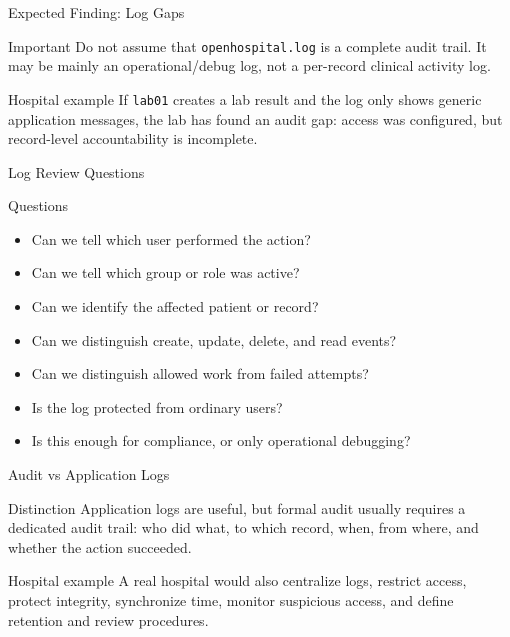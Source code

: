 \documentclass[presentation]{beamer}
\begin{document}
\begin{frame}[c]{Expected Finding: Log Gaps}
\begin{block}{Important}
Do not assume that \texttt{openhospital.log} is a complete audit trail. It may be mainly an
operational/debug log, not a per-record clinical activity log.
\end{block}

\begin{exampleblock}{Hospital example}
If \texttt{lab01} creates a lab result and the log only shows generic application messages, the lab
has found an audit gap: access was configured, but record-level accountability is incomplete.
\end{exampleblock}
\end{frame}

\begin{frame}[c]{Log Review Questions}
\begin{block}{Questions}
\begin{itemize}
    \item Can we tell which user performed the action?
    \item Can we tell which group or role was active?
    \item Can we identify the affected patient or record?
    \item Can we distinguish create, update, delete, and read events?
    \item Can we distinguish allowed work from failed attempts?
    \item Is the log protected from ordinary users?
    \item Is this enough for compliance, or only operational debugging?
\end{itemize}
\end{block}
\end{frame}

\begin{frame}[c]{Audit vs Application Logs}
\begin{block}{Distinction}
Application logs are useful, but formal audit usually requires a dedicated audit trail: who did
what, to which record, when, from where, and whether the action succeeded.
\end{block}

\begin{exampleblock}{Hospital example}
A real hospital would also centralize logs, restrict access, protect integrity, synchronize time,
monitor suspicious access, and define retention and review procedures.
\end{exampleblock}
\end{frame}
\end{document}
